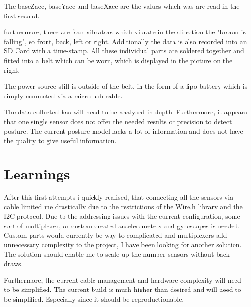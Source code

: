 The baseZacc, baseYacc and baseXacc are the values which was are read in the first second. 

furthermore, there are four vibrators  which vibrate in the direction the "broom is falling", so front, back, left or right. Additionally the data is also recorded into an SD Card with a time-stamp. All these individual parts are soldered together and fitted into a belt which can be worn, which is displayed in the picture on the right.

The power-source still is outside of the belt, in the form of a \gls{lipo battery} which is simply connected via a micro usb cable.

The data collected has will need to be analysed in-depth. Furthermore, it appears that one single sensor does not offer the needed results or precision to detect posture. The current posture model lacks a lot of information and does not have the quality to give useful information. 

\section{Learnings}

After this first attempts i quickly realised, that connecting all the sensors via cable limited me drastically due to the restrictions of the Wire.h library and the I2C protocol. Due to the addressing issues with the current configuration, some sort of multiplexer, or custom created accelerometers and gyroscopes is needed. Custom parts would currently be way to complicated and multiplexers add unnecessary complexity to the project, I have been looking for another solution. The solution should enable me to scale up the number sensors without back-draws.

Furthermore, the current cable management and hardware complexity will need to be simplified. The current build is much higher than desired and will need to be simplified. Especially since it should be reproductionable.

